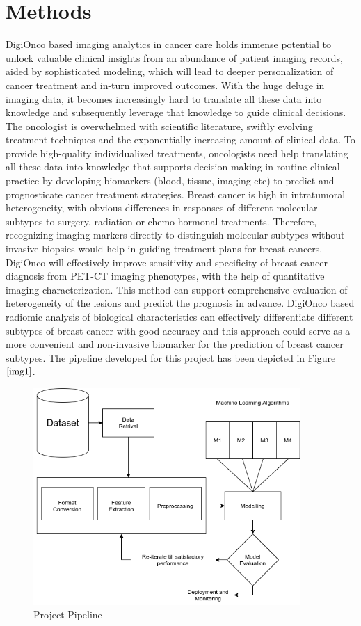 \documentclass[final,1p,times,twocolumn]{elsarticle}
\begin{document}
\section{Methods}
DigiOnco based imaging analytics in cancer care holds immense potential to unlock valuable clinical insights from an abundance of patient imaging records, aided by sophisticated modeling, which will lead to deeper personalization of cancer treatment and in-turn improved outcomes. With the huge deluge in imaging data, it becomes increasingly hard to translate all these data into knowledge and subsequently leverage that knowledge to guide clinical decisions. The oncologist is overwhelmed with scientific literature, swiftly evolving treatment techniques and the exponentially increasing amount of clinical data. To provide high-quality individualized treatments, oncologists need help translating all these data into knowledge that supports decision-making in routine clinical practice by developing biomarkers (blood, tissue, imaging etc) to predict and prognosticate cancer treatment strategies. Breast cancer is high in intratumoral heterogeneity, with obvious differences in responses of different molecular subtypes to surgery, radiation or chemo-hormonal treatments. Therefore, recognizing imaging markers directly to distinguish molecular subtypes without invasive biopsies would help in guiding treatment plans for breast cancers. DigiOnco will effectively improve sensitivity and specificity of breast cancer diagnosis from PET-CT imaging phenotypes, with the help of quantitative imaging characterization. This method can support comprehensive evaluation of heterogeneity of the lesions and predict the prognosis in advance. DigiOnco based radiomic  analysis of  biological characteristics  can effectively differentiate different subtypes of breast cancer with good accuracy and this approach could serve as a more convenient and non-invasive biomarker for the prediction of breast cancer subtypes. The pipeline developed for this project has been depicted in Figure $\ref{img1}$. 

\begin{figure}[!t]
\centering
\includegraphics[width=4in]{flowchart.png}
\caption{Project Pipeline}
\label{img1}
\end{figure}
\end{document}
